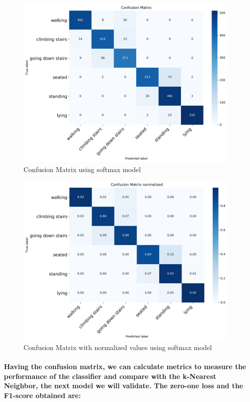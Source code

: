 \documentclass[a4paper]{article}    %
\begin{document}
\begin{figure}[H]
    \centering
    \includegraphics[width=11cm]{cm_raw}
    \caption{Confusion Matrix using softmax model}
    \label{fig:ex2-a-cm_raw}
\end{figure}

\begin{figure}[H]
    \centering
    \includegraphics[width=11cm]{cm_norm}
    \caption{Confusion Matrix with normalized values using softmax model}
    \label{fig:ex2-a-cm_norm}
\end{figure}

\paragraph{Having the confusion matrix, we can calculate metrics to measure the performance of the classifier and compare with the k-Nearest Neighbor, the next model we will validate. The zero-one loss and the F1-score obtained are:}
\end{document}
